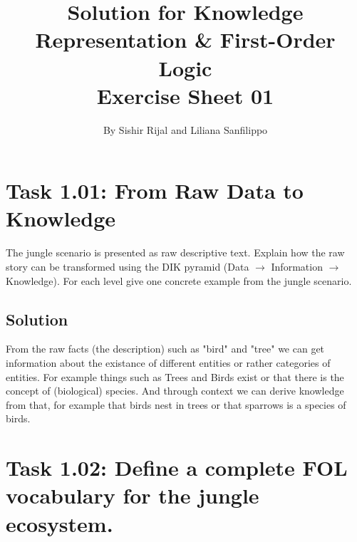 \documentclass[11pt,a4paper]{article}
\author{By Sishir Rijal and Liliana Sanfilippo}
\title{\textbf{Solution for Knowledge Representation \& First-Order Logic\\[4pt]
		Exercise Sheet 01}}
\date{}
\newenvironment{solution}{%
	\begin{tcolorbox}[
		breakable,
		colback=green!4,
		colframe=green!50!black,
		fonttitle=\bfseries,
		title={ Solution},
		left=6pt, right=6pt, top=4pt, bottom=4pt
		]%
	}{%
	\end{tcolorbox}%
}
\begin{document}
	\maketitle
	\section*{}

\section*{Task 1.01: From Raw Data to Knowledge}

The jungle scenario is presented as raw descriptive text. Explain how the raw story can be transformed using the DIK pyramid
(Data $\to$ Information $\to$ Knowledge). For each level give one concrete example from the jungle scenario.

	\subsection*{Solution}
\begin{solution}

From the raw facts (the description) such as "bird" and "tree" we can get information about the existance of different entities or rather categories of entities. For example things such as Trees and Birds exist or that there is the concept of (biological) species. And through context we can derive knowledge from that, for example that birds nest in trees or that sparrows is a species of birds. \end{solution}





\section*{Task 1.02: Define a complete FOL vocabulary for the jungle ecosystem.}
\end{document}
